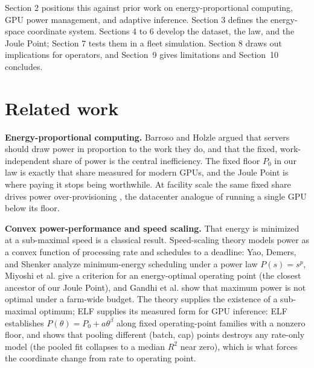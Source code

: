 Section 2 positions this against prior work on energy-proportional computing, GPU power management, and
adaptive inference. Section 3 defines the energy-space coordinate system. Sections 4 to 6 develop the dataset,
the law, and the Joule Point; Section 7 tests them in a fleet simulation. Section 8 draws out implications for
operators, and Section~9 gives limitations and Section~10 concludes.

\section{Related work}\label{related-work}

\textbf{Energy-proportional computing.} Barroso and Holzle \cite{ref1} argued that servers should draw power in
proportion to the work they do, and that the fixed, work-independent share of power is the central
inefficiency. The fixed floor {\(P_0\)} in our law is exactly that share measured for modern
GPUs, and the Joule Point is where paying it stops being worthwhile. At facility scale the same fixed share
drives power over-provisioning \cite{ref15}, the datacenter analogue of running a single GPU below its floor.

\textbf{Convex power-performance and speed scaling.} That energy is minimized at a sub-maximal speed is a
classical result. Speed-scaling theory models power as a convex function of processing rate and schedules to a
deadline: Yao, Demers, and Shenker \cite{ref35} analyze minimum-energy scheduling under a power law
{\(P(s)=s^p\)}, Miyoshi et al. \cite{ref36} give a criterion for an energy-optimal operating point (the
closest ancestor of our Joule Point), and Gandhi et al. \cite{ref37} show that maximum power is not optimal under a
farm-wide budget. The theory supplies the existence of a sub-maximal optimum; ELF supplies its measured form for GPU
inference: ELF establishes {\(P(\theta)=P_0+a\theta^{\beta}\)} along fixed operating-point families with a
nonzero floor, and shows that pooling different (batch, cap) points destroys any rate-only model (the pooled fit
collapses to a median {\(R^2\)} near zero), which is what forces the coordinate change from rate to
operating point.

